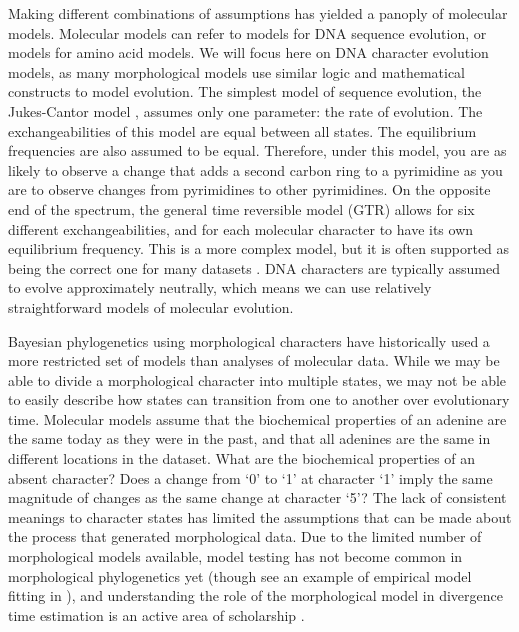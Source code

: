 Making different combinations of assumptions has yielded a panoply of molecular models.
Molecular models can refer to models for DNA sequence evolution, or models for amino acid models. 
We will focus here on DNA character evolution models, as many morphological models use similar logic and mathematical constructs to model evolution.
The simplest model of sequence evolution, the Jukes-Cantor model \citep{Jukes1969}, assumes only one parameter: the rate of evolution.
The exchangeabilities of this model are equal between all states. 
The equilibrium frequencies are also assumed to be equal.
Therefore, under this model, you are as likely to observe a change that adds a second carbon ring to a pyrimidine as you are to observe changes from pyrimidines to other pyrimidines.
On the opposite end of the spectrum, the general time reversible model (GTR) \citep{Tavare1986} allows for six different exchangeabilities, and for each molecular character to have its own equilibrium frequency.
This is a more complex model, but it is often supported as being the correct one for many datasets \citep{abadi2019}.
DNA characters are typically assumed to evolve approximately neutrally, which means we can use relatively straightforward models of molecular evolution.


Bayesian phylogenetics using morphological characters have
historically used a more restricted set of models than analyses of molecular data.
While we may be able to divide a morphological character into multiple states, we may not be able to easily describe how states can transition from one to another over evolutionary time.
Molecular models assume that the biochemical properties of an adenine are the same today as they were in the past, and
that all adenines are the same in different locations in the dataset.
What are the biochemical properties of an absent character?
Does a change from `0' to `1' at character `1' imply the same magnitude of changes as the same change at character `5'?
The lack of consistent meanings to character states has limited the assumptions that can be made about the process that generated morphological data.
Due to the limited number of morphological models available, model testing has not become common in morphological phylogenetics yet (though see an example of empirical model fitting in \cite*{bapst2017}), and understanding the role of the morphological model in divergence time estimation is an active area of scholarship \citep{Klopfstein2019}. 

